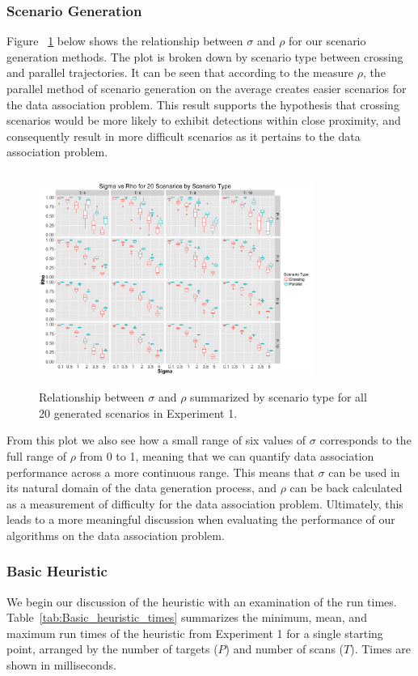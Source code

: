 \documentclass[journal]{IEEEtran}
\begin{document}
\subsubsection{Scenario Generation}
Figure ~\ref{fig:Sigma_vs_Rho} below shows the relationship between $\sigma$ and $\rho$ for our scenario generation methods. The plot is broken down by scenario type between crossing and parallel trajectories. It can be seen that according to the measure $\rho$, the parallel method of scenario generation on the average creates easier scenarios for the data association problem. This result supports the hypothesis that crossing scenarios would be more likely to exhibit detections within close proximity, and consequently result in more difficult scenarios as it pertains to the data association problem. 

\begin{figure}[h]
  \centering
  \includegraphics[width=9cm, height=7cm]{Sigma_vs_Rho}
  \caption{Relationship between $\sigma$ and $\rho$ summarized by scenario type for all 20 generated scenarios in Experiment 1.}
  \label{fig:Sigma_vs_Rho}
\end{figure}

From this plot we also see how a small range of six values of $\sigma$ corresponds to the full range of $\rho$ from 0 to 1, meaning that we can quantify data association performance across a more continuous range. This means that $\sigma$ can be used in its natural domain of the data generation process, and $\rho$ can be back calculated as a measurement of difficulty for the data association problem. Ultimately, this leads to a more meaningful discussion when evaluating the performance of our algorithms on the data association problem. 

\subsubsection{Basic Heuristic}
We begin our discussion of the heuristic with an examination of the run times. Table~\ref{tab:Basic_heuristic_times} summarizes the minimum, mean, and maximum run times of the heuristic from Experiment 1 for a single starting point, arranged by the number of targets ($P$) and number of scans ($T$). Times are shown in milliseconds. 
\end{document}
